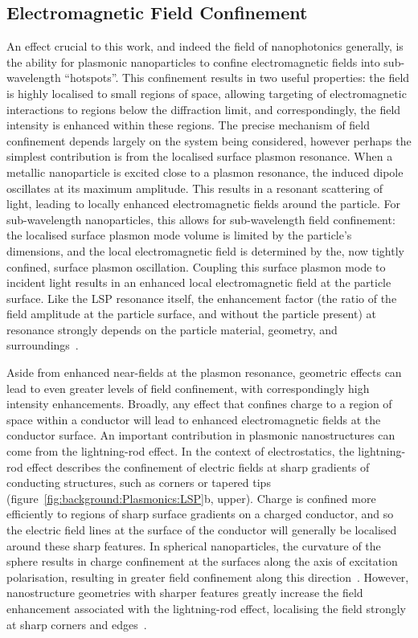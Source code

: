 \subsection{Electromagnetic Field Confinement}\label{sec:Plasmonics:confinement}

An effect crucial to this work, and indeed the field of nanophotonics generally, is the ability for plasmonic nanoparticles to confine electromagnetic fields into sub-wavelength ``hotspots''. This confinement results in two useful properties: the field is highly localised to small regions of space, allowing targeting of electromagnetic interactions to regions below the diffraction limit, and correspondingly, the field intensity is enhanced within these regions. The precise mechanism of field confinement depends largely on the system being considered, however perhaps the simplest contribution is from the localised surface plasmon resonance. 
When a metallic nanoparticle is excited close to a plasmon resonance, the induced dipole oscillates at its maximum amplitude. This results in a resonant scattering of light, leading to locally enhanced electromagnetic fields around the particle. For sub-wavelength nanoparticles, this allows for sub-wavelength field confinement: the localised surface plasmon mode volume is limited by the particle's dimensions, and the local electromagnetic field is determined by the, now tightly confined, surface plasmon oscillation. Coupling this surface plasmon mode to incident light results in an enhanced local electromagnetic field at the particle surface. Like the LSP resonance itself, the enhancement factor (the ratio of the field amplitude at the particle surface, and without the particle present) at resonance strongly depends on the particle material, geometry, and surroundings~\cite{Dynich2009, Tanabe2008}.

Aside from enhanced near-fields at the plasmon resonance, geometric effects can lead to even greater levels of field confinement, with correspondingly high intensity enhancements. Broadly, any effect that confines charge to a region of space within a conductor will lead to enhanced electromagnetic fields at the conductor surface. 
An important contribution in plasmonic nanostructures can come from the lightning-rod effect. In the context of electrostatics, the lightning-rod effect describes the confinement of electric fields at sharp gradients of conducting structures, such as corners or tapered tips (figure~\ref{fig:background:Plasmonics:LSP}b, upper). Charge is confined more efficiently to regions of sharp surface gradients on a charged conductor, and so the electric field lines at the surface of the conductor will generally be localised around these sharp features. In spherical nanoparticles, the curvature of the sphere results in charge confinement at the surfaces along the axis of excitation polarisation, resulting in greater field confinement along this direction~\cite{Tanabe2008}. However, nanostructure geometries with sharper features greatly increase the field enhancement associated with the lightning-rod effect, localising the field strongly at sharp corners and edges~\cite{Dreaden2011, Lee2010, Valev2012d}.

